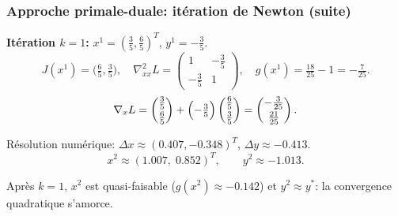 \documentclass[t,usepdftitle=false,aspectratio=169]{beamer}
\begin{document}
\begin{frame}
\frametitle{Approche primale-duale: itération de Newton (suite)}

\textbf{Itération $k=1$:} $x^1=(\tfrac{3}{5},\tfrac{6}{5})^T$, $y^1=-\tfrac{3}{5}$.
$$
J(x^1)=\bigl(\tfrac{6}{5},\tfrac{3}{5}\bigr),\quad
\nabla^2_{xx}L = \begin{pmatrix}1&-\tfrac{3}{5}\\-\tfrac{3}{5}&1\end{pmatrix},\quad
g(x^1)=\tfrac{18}{25}-1=-\tfrac{7}{25}.
$$
$$
\nabla_x L = \begin{pmatrix}\tfrac{3}{5}\\[2pt]\tfrac{6}{5}\end{pmatrix}
+ \Bigl(-\tfrac{3}{5}\Bigr)\begin{pmatrix}\tfrac{6}{5}\\[2pt]\tfrac{3}{5}\end{pmatrix}
= \begin{pmatrix}-\tfrac{3}{25}\\[2pt]\tfrac{21}{25}\end{pmatrix}.
$$

Résolution numérique: $\Delta x \approx (0.407, -0.348)^T$, $\Delta y \approx -0.413$.
$$
x^2 \approx (1.007,\; 0.852)^T, \qquad y^2 \approx -1.013.
$$

\mbox{}

Après $k=1$, $x^2$ est quasi-faisable ($g(x^2)\approx -0.142$) et $y^2 \approx y^*$: la convergence quadratique s'amorce.

\end{frame}
\end{document}
